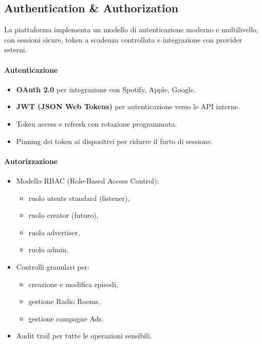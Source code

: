 \documentclass[11pt,a4paper]{article}
\begin{document}
\subsection{Authentication \& Authorization}

La piattaforma implementa un modello di autenticazione moderno e multilivello, con sessioni sicure, token a scadenza controllata e integrazione con provider esterni.

\paragraph{Autenticazione}
\begin{itemize}
    \item \textbf{OAuth 2.0} per integrazione con Spotify, Apple, Google.
    \item \textbf{JWT (JSON Web Tokens)} per autenticazione verso le API interne.
    \item Token access e refresh con rotazione programmata.
    \item Pinning dei token ai dispositivi per ridurre il furto di sessione.
\end{itemize}

\paragraph{Autorizzazione}
\begin{itemize}
    \item Modello RBAC (Role-Based Access Control):
    \begin{itemize}
        \item ruolo utente standard (listener),
        \item ruolo creator (futuro),
        \item ruolo advertiser,
        \item ruolo admin.
    \end{itemize}
    \item Controlli granulari per:
    \begin{itemize}
        \item creazione e modifica episodi,
        \item gestione Radio Rooms,
        \item gestione campagne Ads.
    \end{itemize}
    \item Audit trail per tutte le operazioni sensibili.
\end{itemize}
\end{document}
